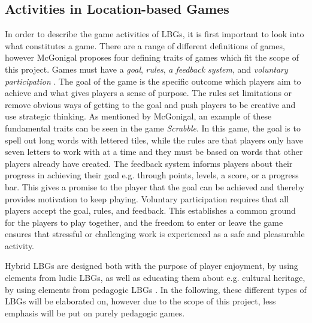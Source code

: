 \subsection{Activities in Location-based Games}
In order to describe the game activities of LBGs, it is first important to look into what constitutes a game. There are a range of different definitions of games, however McGonigal proposes four defining traits of games which fit the scope of this project. Games must have a \textit{goal}, \textit{rules}, \textit{a feedback system}, and \textit{voluntary participation} \cite{RealityIsBroken}. The goal of the game is the specific outcome which players aim to achieve and what gives players a sense of purpose. The rules set limitations or remove obvious ways of getting to the goal and push players to be creative and use strategic thinking. As mentioned by McGonigal, an example of these fundamental traits can be seen in the game \textit{Scrabble}. In this game, the goal is to spell out long words with lettered tiles, while the rules are that players only have seven letters to work with at a time and they must be based on words that other players already have created. The feedback system informs players about their progress in achieving their goal e.g. through points, levels, a score, or a progress bar. This gives a promise to the player that the goal can be achieved and thereby provides motivation to keep playing. Voluntary participation requires that all players accept the goal, rules, and feedback. This establishes a common ground for the players to play together, and the freedom to enter or leave the game ensures that stressful or challenging work is experienced as a safe and pleasurable activity. 

Hybrid LBGs are designed both with the purpose of player enjoyment, by using elements from ludic LBGs, as well as educating them about e.g. cultural heritage, by using elements from pedagogic LBGs \cite{LBG_Review}. In the following, these different types of LBGs will be elaborated on, however due to the scope of this project, less emphasis will be put on purely pedagogic games.

